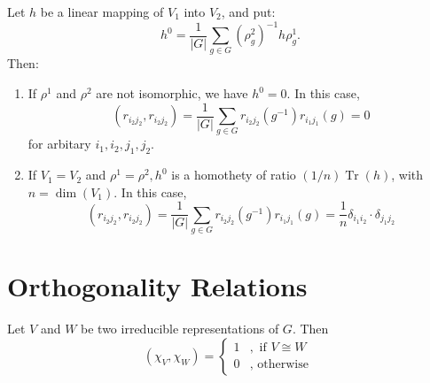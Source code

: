 \documentclass[12pt, oneside]{book}
\begin{document}
\begin{corollary}
    Let $h$ be a linear mapping of $V_1$ into $V_2$, and put:
    \begin{equation*}
        h^0=\frac{1}{\left|G\right|} \sum_{g \in G}\left(\rho_g^2\right)^{-1} h \rho_g^1 .
    \end{equation*}
    Then:
    \begin{enumerate}
        \item
              If $\rho^1$ and $\rho^2$ are not isomorphic, we have $h^0=0$. In this case,
              \begin{equation*}
                  \left(r_{i_2j_2},r_{i_2j_2}
                  \right)
                  =
                  \frac{1}{\left|G\right|}\sum_{g\in G} r_{i_2j_2}(g^{-1}) r_{i_1j_1}(g) =0
              \end{equation*}
              for arbitary $i_1,i_2,j_1,j_2$.

        \item
              If $V_1=V_2$ and $\rho^1=\rho^2, h^0$ is a homothety of ratio $(1 / n) \operatorname{Tr}(h)$, with $n=\operatorname{dim}\left(V_1\right)$.
              In this case,
              \begin{equation*}
                  \left(r_{i_2j_2},r_{i_2j_2}
                  \right)
                  =
                  \frac{1}{\left|G\right|}\sum_{g\in G} r_{i_2j_2}(g^{-1}) r_{i_1j_1}(g)
                  =
                  \frac{1}{n} \delta_{i_1 i_2}\cdot \delta_{j_1 j_2}
              \end{equation*}
    \end{enumerate}
\end{corollary}


\section{Orthogonality Relations}

\begin{theorem}
    Let $V$ and $W$ be two irreducible representations of $G$. Then
    \begin{equation*}
        \left(\chi_V ,\chi_W \right)
        =
        \begin{cases}
            1 & , \text{ if } V\cong W \\
            0 & , \text { otherwise }
        \end{cases}
    \end{equation*}
\end{theorem}
\end{document}
